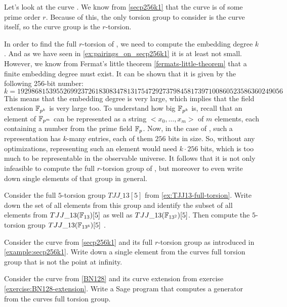 \begin{example} 
\label{example:secp256k1}
Let's look at the curve . We know from \examplename{} \ref{secp256k1} that the curve is of some prime order $r$. Because of this, the only torsion group to consider is the curve itself, so the curve group is the $r$-torsion. 

In order to find the full $r$-torsion of , we need to compute the embedding degree $k$. And as we have seen in \ref{ex:pairings_on_secp256k1} it is at least not small. However, we know from Fermat's little theorem \ref{fermats-little-theorem} that a finite embedding degree must exist. It can be shown that it is given by the following 256-bit number:
$$
k = \scriptstyle 192986815395526992372618308347813175472927379845817397100860523586360249056 
$$
This means that the embedding degree is very large, which implies that the field extension $\mathbb{F}_{p^k}$ is very large too. To understand how big $\mathbb{F}_{p^k}$ is, recall that an element of $\mathbb{F}_{p^m}$ can be represented as a string $<x_0,\ldots,x_m>$ of $m$ elements, each containing a number from the prime field $\mathbb{F}_p$. Now, in the case of , such a representation has $k$-many entries, each of them $256$ bits in size. So, without any optimizations, representing such an element would need $k\cdot 256$ bits, which is too much to be representable in the observable universe. It follows that it is not only infeasible to compute the full $r$-torsion group of , but moreover to even write down single elements of that group in general. 
\end{example}
\begin{exercise} Consider the full $5$-torsion group $TJJ\_13[5]$ from \examplename{} \ref{ex:TJJ13-full-torsion}. Write down the set of all elements from this group and identify the subset of all elements from $TJJ\_13(\mathbb{F}_{13})[5]$ as well as $TJJ\_13(\mathbb{F}_{13^2})[5]$. Then compute the $5$-torsion group $TJJ\_13(\mathbb{F}_{13^{8}})[5]$ .
\end{exercise}
\begin{exercise} Consider the curve  from \examplename{} \ref{secp256k1} and its full $r$-torsion group as introduced in \examplename{} \ref{example:secp256k1}. Write down a single element from the curves full torsion group that is not the point at infinity.
\end{exercise}
\begin{exercise}
\label{exercise:BN128-full-torsion}
 Consider the curve  from \examplename{} \ref{BN128} and its curve extension from exercise \ref{exercise:BN128-extension}. Write a Sage program that computes a generator from the curves full torsion group.
\end{exercise}

